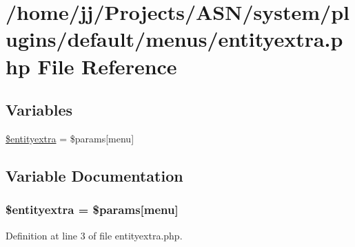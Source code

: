 \hypertarget{system_2plugins_2default_2menus_2entityextra_8php}{}\section{/home/jj/\+Projects/\+A\+S\+N/system/plugins/default/menus/entityextra.php File Reference}
\label{system_2plugins_2default_2menus_2entityextra_8php}
\subsection*{Variables}
\begin{DoxyCompactItemize}
\item 
\hyperlink{system_2plugins_2default_2menus_2entityextra_8php_a49c9f0f64ec7c8b9aa3defaa4177af8d}{\$entityextra} = \$params\mbox{[}\textquotesingle{}menu\textquotesingle{}\mbox{]}
\end{DoxyCompactItemize}


\subsection{Variable Documentation}
\subsubsection[{\texorpdfstring{\$entityextra}{$entityextra}}]{\setlength{\rightskip}{0pt plus 5cm}\$entityextra = \$params\mbox{[}\textquotesingle{}menu\textquotesingle{}\mbox{]}}\hypertarget{system_2plugins_2default_2menus_2entityextra_8php_a49c9f0f64ec7c8b9aa3defaa4177af8d}{}\label{system_2plugins_2default_2menus_2entityextra_8php_a49c9f0f64ec7c8b9aa3defaa4177af8d}


Definition at line 3 of file entityextra.\+php.

